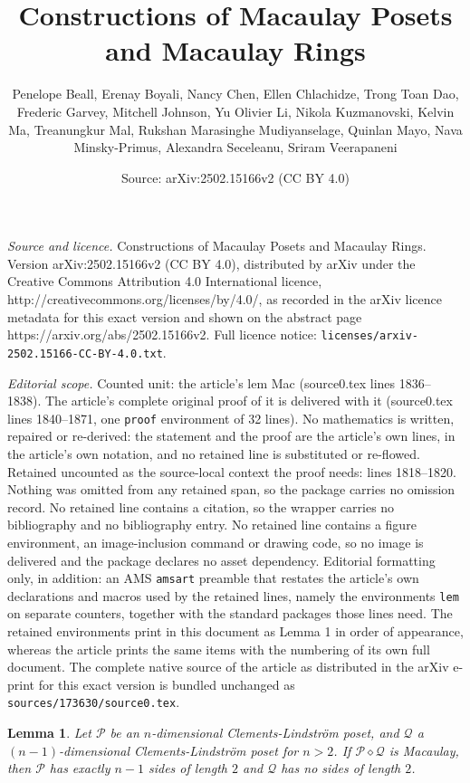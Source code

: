 \documentclass[10pt,a4paper]{amsart}
\title{Constructions of Macaulay Posets and Macaulay Rings}
\author{Penelope Beall, Erenay Boyali, Nancy Chen, Ellen Chlachidze, Trong Toan Dao, Frederic Garvey, Mitchell Johnson, Yu Olivier Li, Nikola Kuzmanovski, Kelvin Ma, Treanungkur Mal, Rukshan Marasinghe Mudiyanselage, Quinlan Mayo, Nava Minsky-Primus, Alexandra Seceleanu, Sriram Veerapaneni}
\date{Source: arXiv:2502.15166v2 (CC BY 4.0)}
\newtheorem{lem}{Lemma}
\renewcommand{\P}{{\mathcal P}}
\newcommand{\Q}{{\mathcal Q}}
\begin{document}
\maketitle

\noindent\emph{Source and licence.} Constructions of Macaulay Posets and Macaulay Rings. Version arXiv:2502.15166v2 (CC BY 4.0), distributed by arXiv under the Creative Commons Attribution 4.0 International licence, http://creativecommons.org/licenses/by/4.0/, as recorded in the arXiv licence metadata for this exact version and shown on the abstract page https://arxiv.org/abs/2502.15166v2. Full licence notice: \texttt{licenses/arxiv-2502.15166-CC-BY-4.0.txt}.\par\smallskip

\noindent\textit{Editorial scope.} Counted unit: the article's lem Mac (source0.tex lines 1836--1838). The article's complete original proof of it is delivered with it (source0.tex lines 1840--1871, one \texttt{proof} environment of 32 lines). No mathematics is written, repaired or re-derived: the statement and the proof are the article's own lines, in the article's own notation, and no retained line is substituted or re-flowed.  Retained uncounted as the source-local context the proof needs: lines 1818--1820.  Nothing was omitted from any retained span, so the package carries no omission record.  No retained line contains a citation, so the wrapper carries no bibliography and no bibliography entry.  No retained line contains a figure environment, an image-inclusion command or drawing code, so no image is delivered and the package declares no asset dependency.  Editorial formatting only, in addition: an AMS \texttt{amsart} preamble that restates the article's own declarations and macros used by the retained lines, namely the environments \texttt{lem} on separate counters, together with the standard packages those lines need.  The retained environments print in this document as Lemma 1 in order of appearance, whereas the article prints the same items with the numbering of its own full document.  The complete native source of the article as distributed in the arXiv e-print for this exact version is bundled unchanged as \texttt{sources/173630/source0.tex}.
\begin{lem} \label{lem: n-1 2s}
    Let $\P$ be an $n$-dimensional Clements-Lindstr\"om poset, and $\Q$ a $(n-1)$-dimensional Clements-Lindstr\"om poset for $n > 2$. If $\P \diamond \Q$ is Macaulay, then $\P$ has exactly $n-1$ sides of length $2$ and $\Q$ has no sides of length $2$.
\end{lem}
\end{document}
